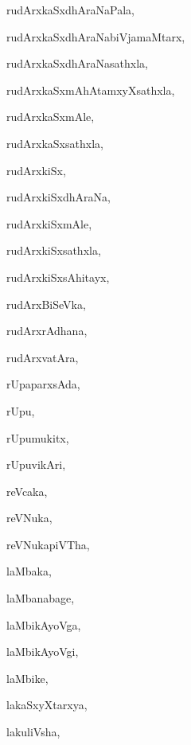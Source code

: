 \begin{multicols}{3}
{\noindent
{rudArxkaSxdhAraNaPala}, \pageref{rudArxkaSxdhAraNaPala}

\noindent
{rudArxkaSxdhAraNabiVjamaMtarx}, \pageref{rudArxkaSxdhAraNabiVjamaMtarx}

\noindent
{rudArxkaSxdhAraNasathxla}, \pageref{rudArxkaSxdhAraNasathxla}

\noindent
{rudArxkaSxmAhAtamxyXsathxla}, \pageref{rudArxkaSxmAhAtamxyXsathxla}

\noindent
{rudArxkaSxmAle}, \pageref{rudArxkaSxmAle}

\noindent
{rudArxkaSxsathxla}, \pageref{rudArxkaSxsathxla}

\noindent
{rudArxkiSx}, \pageref{rudArxkiSx}

\noindent
{rudArxkiSxdhAraNa}, \pageref{rudArxkiSxdhAraNa}

\noindent
{rudArxkiSxmAle}, \pageref{rudArxkiSxmAle}

\noindent
{rudArxkiSxsathxla}, \pageref{rudArxkiSxsathxla}

\noindent
{rudArxkiSxsAhitayx}, \pageref{rudArxkiSxsAhitayx}

\noindent
{rudArxBiSeVka}, \pageref{rudArxBiSeVka}

\noindent
{rudArxrAdhana}, \pageref{rudArxrAdhana}

\noindent
{rudArxvatAra}, \pageref{rudArxvatAra}

\noindent
{rUpaparxsAda}, \pageref{rUpaparxsAda}

\noindent
{rUpu}, \pageref{rUpu}

\noindent
{rUpumukitx}, \pageref{rUpumukitx}

\noindent
{rUpuvikAri}, \pageref{rUpuvikAri}

\noindent
{reVcaka}, \pageref{reVcaka}

\noindent
{reVNuka}, \pageref{reVNuka}

\noindent
{reVNukapiVTha}, \pageref{reVNukapiVTha}

\noindent
{laMbaka}, \pageref{laMbaka}

\noindent
{laMbanabage}, \pageref{laMbanabage}

\noindent
{laMbikAyoVga}, \pageref{laMbikAyoVga}

\noindent
{laMbikAyoVgi}, \pageref{laMbikAyoVgi}

\noindent
{laMbike}, \pageref{laMbike}

\noindent
{lakaSxyXtarxya}, \pageref{lakaSxyXtarxya}

\noindent
{lakuliVsha}, \pageref{lakuliVsha}

}
\end{multicols}
